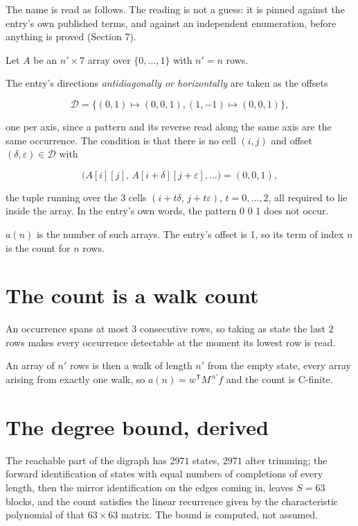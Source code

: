 \documentclass[11pt]{article}
\theoremstyle{definition}
\begin{document}
The name is read as follows. The reading is not a guess: it is pinned against the entry's own published terms, and against an independent enumeration, before anything is proved (Section 7).

Let $A$ be an $n' \times 7$ array over $\{0,\dots,1\}$ with $n' = n$ rows.

The entry's directions {\itshape antidiagonally or horizontally} are taken as the offsets

\[\mathcal{D} = \{(0,1)\mapsto(0,0,1), (1,-1)\mapsto(0,0,1)\},\]

one per axis, since a pattern and its reverse read along the same axis are the same occurrence. The condition is that there is no cell $(i,j)$ and offset $(\delta,\varepsilon)\in\mathcal{D}$ with

\[\bigl(A[i][j],\,A[i{+}\delta][j{+}\varepsilon],\dots\bigr) = (0, 0, 1),\]

the tuple running over the $3$ cells $(i+t\delta,\,j+t\varepsilon)$, $t = 0,\dots,2$, all required to lie inside the array. In the entry's own words, the pattern 0 0 1 does not occur.

$a(n)$ is the number of such arrays. The entry's offset is 1, so its term of index $n$ is the count for $n$ rows.

\section{The count is a walk count}

An occurrence spans at most $3$ consecutive rows, so taking as state the last $2$ rows makes every occurrence detectable at the moment its lowest row is read.

An array of $n'$ rows is then a walk of length $n'$ from the empty state, every array arising from exactly one walk, so $a(n) = w^{\mathsf T}M^{\,n'}f$ and the count is C-finite.

\section{The degree bound, derived}

The reachable part of the digraph has $2971$ states, $2971$ after trimming; the forward identification of states with equal numbers of completions of every length, then the mirror identification on the edges coming in, leaves $S = 63$ blocks, and the count satisfies the linear recurrence given by the characteristic polynomial of that $63\times63$ matrix. The bound is computed, not assumed.
\end{document}
